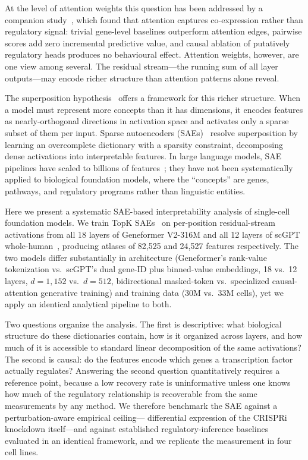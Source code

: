 \documentclass[onecolumn,11pt]{article}
\begin{document}
At the level of attention weights this question has been addressed by a companion
study~\cite{kendiukhov2025systematic}, which found that attention captures co-expression rather
than regulatory signal: trivial gene-level baselines outperform attention edges, pairwise scores
add zero incremental predictive value, and causal ablation of putatively regulatory heads produces
no behavioural effect. Attention weights, however, are one view among several. The residual
stream---the running sum of all layer outputs---may encode richer structure than attention patterns
alone reveal.

The superposition hypothesis~\cite{elhage2022superposition} offers a framework for this richer
structure. When a model must represent more concepts than it has dimensions, it encodes features as
nearly-orthogonal directions in activation space and activates only a sparse subset of them per
input. Sparse autoencoders
(SAEs)~\cite{olshausen1997sparse,sharkey2022taking,cunningham2023sparse,bricken2023monosemanticity}
resolve superposition by learning an overcomplete dictionary with a sparsity constraint,
decomposing dense activations into interpretable features. In large language models, SAE pipelines
have scaled to billions of features~\cite{gao2024scaling,templeton2024scaling}; they have not been
systematically applied to biological foundation models, where the ``concepts'' are genes, pathways,
and regulatory programs rather than linguistic entities.

Here we present a systematic SAE-based interpretability analysis of single-cell foundation models.
We train TopK SAEs~\cite{makhzani2013ksparse} on per-position residual-stream activations from all
18 layers of Geneformer V2-316M and all 12 layers of scGPT whole-human~\cite{cui2024scgpt},
producing atlases of 82,525 and 24,527 features respectively. The two models differ substantially
in architecture (Geneformer's rank-value tokenization vs.\ scGPT's dual gene-ID plus binned-value
embeddings, 18 vs.\ 12 layers, $d{=}1{,}152$ vs.\ $d{=}512$, bidirectional masked-token vs.\
specialized causal-attention generative training) and training data (30M vs.\ 33M cells), yet we
apply an identical analytical pipeline to both.

Two questions organize the analysis. The first is descriptive: what biological structure do these
dictionaries contain, how is it organized across layers, and how much of it is accessible to
standard linear decomposition of the same activations? The second is causal: do the features
encode which genes a transcription factor actually regulates? Answering the second question
quantitatively requires a reference point, because a low recovery rate is uninformative unless one
knows how much of the regulatory relationship is recoverable from the same measurements by any
method. We therefore benchmark the SAE against a perturbation-aware empirical ceiling---
differential expression of the CRISPRi knockdown itself---and against established
regulatory-inference baselines evaluated in an identical framework, and we replicate the
measurement in four cell lines.
\end{document}
